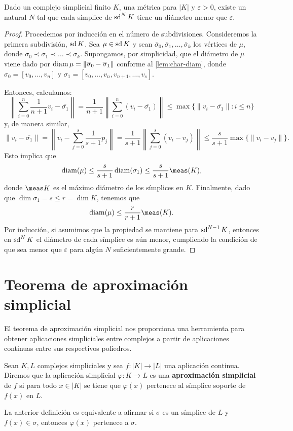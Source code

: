 \begin{teorema}
	\label{teo:cota-medida-complejo}
	Dado un complejo simplicial finito $K$, una métrica para $|K|$ y $\varepsilon > 0$, existe un natural $N$ tal que cada símplice de $\operatorname{sd}^N K$ tiene un diámetro menor que $\varepsilon$.
\end{teorema}
\begin{proof}
	Procedemos por inducción en el número de subdivisiones. Consideremos la primera subdivisión, $\operatorname{sd} K$. Sea $\mu \in \operatorname{sd} K$ y sean $\overline{\sigma}_0, \overline{\sigma}_1, \ldots, \overline{\sigma}_k$ los vértices de $\mu$, donde $\sigma_0 \prec \sigma_1 \prec \ldots \prec \sigma_k$. Supongamos, por simplicidad, que el diámetro de $\mu$ viene dado por $\operatorname{diam} \mu = \|\overline{\sigma}_0 - \overline{\sigma}_1\|$ conforme al \autoref{lem:char-diam}, donde $\sigma_0 = [v_0, \ldots, v_n]$ y $\sigma_1 = [v_0, \ldots, v_n, v_{n+1}, \ldots, v_s]$.
	
	Entonces, calculamos:
	\[
	\left\|\sum_{i=0}^{n}\frac{1}{n+1}v_{i}-\overline{\sigma_{1}}\right\| = \frac{1}{n+1}\left\|\sum_{i=0}^{n}(v_{i}-\overline{\sigma_{1}})\right\| \leq \max\{\|v_{i}-\overline{\sigma_{1}}\| : i\leq n\}
	\]
	y, de manera similar,
	\[
	\|v_{i}-\overline{\sigma_{1}}\| = \left\|v_{i}-\sum_{j=0}^{s}\frac{1}{s+1}p_{j}\right\| = \frac{1}{s+1}\left\|\sum_{j=0}^{s}(v_{i}-v_{j})\right\| \leq \frac{s}{s+1}\max\{\|v_{i}-v_{j}\|\}.
	\]
	Esto implica que
	\[
	\diam(\mu) \leq \frac{s}{s+1}\diam(\sigma_{1}) \leq \frac{s}{s+1} \meas (K),
	\]
	donde $\meas K$ es el máximo diámetro de los símplices en $K$. Finalmente, dado que $\dim \sigma_1 = s \leq r = \dim K$, tenemos que
	\[
	\diam(\mu) \leq \frac{r}{r+1}\meas(K).
	\]
	Por inducción, si asumimos que la propiedad se mantiene para $\operatorname{sd}^{N-1}K$, entonces en $\operatorname{sd}^N K$ el diámetro de cada símplice es aún menor, cumpliendo la condición de que sea menor que $\varepsilon$ para algún $N$ suficientemente grande.
\end{proof}

\section{Teorema de aproximación simplicial}

El teorema de aproximación simplicial nos proporciona una herramienta para obtener aplicaciones simpliciales entre complejos a partir de aplicaciones continuas entre sus respectivos poliedros.

\begin{definicion}
	Sean $K, L$ complejos simpliciales y sea $f: |K| \to |L|$ una aplicación continua. Diremos que la aplicación simplicial $\varphi: K \to L$ es una \textbf{aproximación simplicial} de $f$ si para todo $x \in |K|$ se tiene que $\varphi(x)$ pertenece al símplice soporte de $f(x)$ en $L$.
\end{definicion}
\begin{observacion}
	La anterior definición es equivalente a afirmar si $\sigma$ es un símplice de $L$ y $f(x) \in \sigma$, entonces $\varphi(x)$ pertenece a $\sigma$.
\end{observacion}

